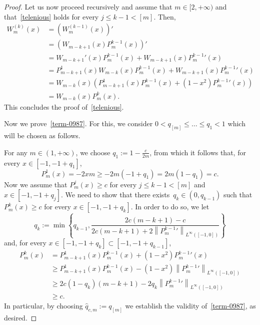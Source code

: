 \documentclass[12pt]{article}
\numberwithin{equation}{section}
\renewcommand{\leq}{\leqslant}
\renewcommand{\geq}{\geqslant}
\begin{document}
\begin{appendix}
\begin{proof}
Let us now proceed recursively and assume that $m\in [2,+\infty)$ and that~\eqref{telenious} holds for every $j\leq k-1<\left[m\right]$. Then, 
\begin{equation*}
\begin{split}
W_m^{(k)}(x)&=\left(W_m^{(k-1)}(x)\right)'\\
&=\left(W_{m-k+1}(x)P_m^{k-1}(x)\right)'\\
&=W_{m-k+1}'(x)P_m^{k-1}(x)+W_{m-k+1}(x){P_m^{k-1}}'(x)\\
&=P_{m-k+1}^1(x)W_{m-k}(x)P_m^{k-1}(x)+W_{m-k+1}(x){P_m^{k-1}}'(x)\\
&=W_{m-k}(x)\left(P_{m-k+1}^1(x)P_m^{k-1}(x)+(1-x^2){P_m^{k-1}}'(x)\right)\\
&=W_{m-k}(x)P_m^k(x).
\end{split}
\end{equation*}
This concludes the proof of~\eqref{telenious}.

Now we prove~\eqref{term-0987}. For this, we consider $0<q_{\left[m\right]}\leq \dots\leq q_1<1$ which will be chosen as follows. 

For any $m\in (1,+\infty)$, we choose $q_1:=1-\frac{c}{2m}$, from which it follows that, for every $x\in \left[-1,-1+q_1\right]$,
\begin{equation*}
P_m^1(x)=-2xm\geq -2m(-1+q_1)=2m(1-q_1)=c.
\end{equation*}
Now we assume that $P_m^j(x)\geq c$ for every $j\leq k-1<\left[m\right]$ and $x\in \left[-1,-1+q_j\right]$. We need to show that there exists~$q_k\in\left(0, q_{k-1}\right)$ such that $P_m^k(x)\geq c$ for every $x\in [-1,-1+q_k]$. In order to do so, we let 
\begin{equation}
q_k:=\min \left\lbrace q_{k-1}, \frac{2c(m-k+1)-c}{2c(m-k+1)+2\left\|{P_m^{k-1}}'\right\|_{L^\infty([-1,0])}} \right\rbrace
\end{equation}
and, for every $x\in [-1,-1+q_k]\subset [-1,-1+q_{k-1}]$,
\begin{equation*}
\begin{split}
P_{m}^k(x)&=P_{m-k+1}^1(x)P_m^{k-1}(x) +(1-x^2){P_m^{k-1}}'(x)\\
&\geq P_{m-k+1}^1(x)P_m^{k-1}(x)-(1-x^2)\left\|{P_m^{k-1}}'\right\|_{L^\infty([-1,0])}\\
& \geq 2c(1-q_k)(m-k+1)-2q_k\left\|{P_m^{k-1}}'\right\|_{L^\infty([-1,0])}\\
&\geq c.
\end{split}
\end{equation*}
In particular, by choosing $\hat{q}_{c,m}:=q_{\left[m\right]}$ we establish the validity of~\eqref{term-0987}, as desired.


\end{proof}
\end{appendix}
\end{document}

